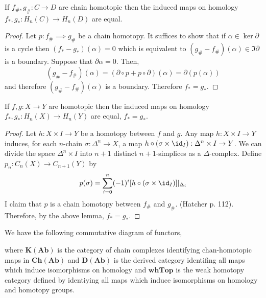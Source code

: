 \documentclass[12pt]{extarticle}
\begin{document}
\begin{lemma}
If $f_{\#}, g_{\#} : C \to D$ are chain homotopic then the induced maps on homology $f_*, g_* : H_n(C) \to H_n(D)$ are equal.
\end{lemma}

\begin{proof}
Let $p : f_{\#} \implies g_{\#}$ be a chain homotopy. It suffices to show that if $\alpha \in \ker{\partial}$ is a cycle then $(f_* - g_*)(\alpha) = 0$ which is equivalent to $(g_{\#} - f_{\#})(\alpha) \in \Im{\partial}$ is a boundary. Suppose that $\partial \alpha = 0$. Then, 
\[ (g_{\#} - f_{\#})(\alpha) = (\partial \circ p + p \circ \partial)(\alpha) = \partial(p(\alpha)) \]
and therefore $(g_{\#} - f_{\#})(\alpha)$ is a boundary. Therefore $f_* = g_*$. 
\end{proof}



\begin{theorem}
If $f, g : X \to Y$ are homotopic then the induced maps on homology $f_*, g_* : H_{n}(X) \to H_n(Y)$ are equal, $f_* = g_*$.
\end{theorem}

\begin{proof}
Let $h : X \times I \to Y$ be a homotopy between $f$ and $g$. Any map $h : X \times I \to Y$ induces, for each $n$-chain $\sigma : \Delta^n \to X$, a map $h \circ (\sigma \times \id_I) : \Delta^n \times I \to Y$. We can divide the space $\Delta^n \times I$ into $n+1$ distinct $n+1$-simplices as a $\Delta$-complex. Define $p_n : C_n(X) \to C_{n+1}(Y)$ by 
\[ p(\sigma) = \sum_{i = 0}^n (-1)^i [h \circ (\sigma \times \id_I)] |_{\Delta_i} \]  
I claim that $p$ is a chain homotopy between $f_{\#}$ and $g_{\#}$. (Hatcher p. 112). Therefore, by the above lemma, $f_* = g_*$.
\end{proof}

\begin{proposition}
We have the following commutative diagram of functors,
\begin{center}
\end{center}
where $\mathbf{K(Ab)}$ is the category of chain complexes identifying chan-homotopic maps in $\mathbf{Ch(Ab)}$ and $\mathbf{D(Ab)}$ is the derived category identifing all maps which induce isomorphisms on homology and $\mathbf{whTop}$ is the weak homotopy category defined by identiying all maps which induce isomorphisms on homology and homotopy groups. 
\end{proposition}
\end{document}
